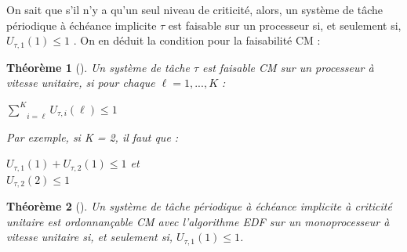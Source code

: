 \documentclass[12pt,a4paper,oneside]{book}
\theoremstyle{break}
\theoremstyle{breakplain}
\newtheorem{theo}{Théorème}[chapter]
\begin{document}
On sait que s'il n'y a qu'un seul niveau de criticité, alors, un système de tâche périodique à échéance implicite $\tau$ est faisable sur un processeur si, et seulement si, $U_{\tau, 1}(1) \leq 1$ \cite{liu1973scheduling}. On en déduit la condition pour la faisabilité CM :
\begin{theo}[\cite{BaruahBDMSS11}]
Un système de tâche $\tau$ est faisable CM sur un processeur à vitesse unitaire, si pour chaque $\ell = 1, ..., K$ :
\begin{center}
$\underset{i = \ell}{\overset{K}{\sum}} U_{\tau,i}(\ell) \leq 1$
\end{center}
 
 Par exemple, si K = 2, il faut que :
 
\begin{center}
$U_{\tau, 1}(1) + U_{\tau, 2}(1) \leq 1$ et\\
$U_{\tau, 2}(2) \leq 1$
\end{center}
\end{theo}

\begin{theo}[\cite{BaruahBDMSS11}]
Un système de tâche périodique à échéance implicite à criticité unitaire est ordonnançable CM avec l'algorithme EDF sur un monoprocesseur à vitesse unitaire si, et seulement si, $U_{\tau, 1}(1) \leq 1$.
\end{theo}
\end{document}
